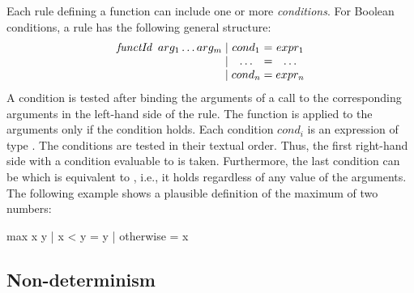 Each rule defining a function
can include one or more \emph{conditions}.
For Boolean conditions, a rule has the following general
structure:
%
\[
\begin{array}{@{} l @{\;|\;} c @{\;=\;} c @{}}
\emph{functId} \;\; arg_1 \ldots arg_m & cond_1 & expr_1 \\
                           & \ldots & \ldots \\
                           & cond_n & expr_n
\end{array}
\]
%
A condition is tested after binding
the arguments of a call to the corresponding arguments
in the left-hand side of the rule.
The function is applied to the arguments only if the condition holds.
%
Each condition $cond_i$ is an expression of type .
The conditions are tested in their textual order.
Thus, the first right-hand side with a condition evaluable to 
is taken. Furthermore, the last condition can be
 which is equivalent to ,
i.e., it holds regardless of any value of the arguments.
%
The following example shows a plausible definition of the maximum
of two numbers:
%
\begin{curry}
max x y | x < y     = y
        | otherwise = x
\end{curry}
%


\subsection{Non-determinism}
\label{Non-determinism}


